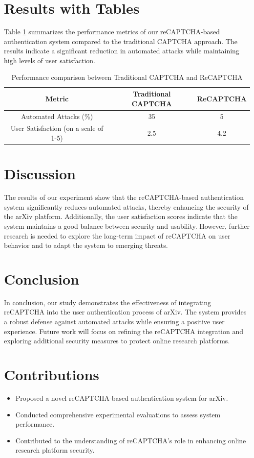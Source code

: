 \documentclass{article}
\begin{document}
\section{Results with Tables}
Table \ref{tab:results} summarizes the performance metrics of our reCAPTCHA-based authentication system compared to the traditional CAPTCHA approach. The results indicate a significant reduction in automated attacks while maintaining high levels of user satisfaction.

\begin{table}[ht]
\centering
\begin{tabular}{|c|c|c|}
\hline
\textbf{Metric} & \textbf{Traditional CAPTCHA} & \textbf{ReCAPTCHA} \\
\hline
Automated Attacks (\%) & 35 & 5 \\
User Satisfaction (on a scale of 1-5) & 2.5 & 4.2 \\
\hline
\end{tabular}
\caption{Performance comparison between Traditional CAPTCHA and ReCAPTCHA}
\label{tab:results}
\end{table}

\section{Discussion}
The results of our experiment show that the reCAPTCHA-based authentication system significantly reduces automated attacks, thereby enhancing the security of the arXiv platform. Additionally, the user satisfaction scores indicate that the system maintains a good balance between security and usability. However, further research is needed to explore the long-term impact of reCAPTCHA on user behavior and to adapt the system to emerging threats.

\section{Conclusion}
In conclusion, our study demonstrates the effectiveness of integrating reCAPTCHA into the user authentication process of arXiv. The system provides a robust defense against automated attacks while ensuring a positive user experience. Future work will focus on refining the reCAPTCHA integration and exploring additional security measures to protect online research platforms.

\section{Contributions}
\begin{itemize}
\item Proposed a novel reCAPTCHA-based authentication system for arXiv.
\item Conducted comprehensive experimental evaluations to assess system performance.
\item Contributed to the understanding of reCAPTCHA's role in enhancing online research platform security.
\end{itemize}



\end{document}
